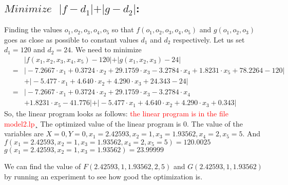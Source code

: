 \documentclass[12pt]{article}
\begin{document}
\subsection{$Minimize \text{ } \vert f-d_1 \vert + \vert g-d_2 \vert$:} Finding the values $o_1,o_2,o_3,o_4,o_5$ so that $f(o_1,o_2,o_3,o_4,o_5)$ and $g(o_1,o_2,o_3)$  goes as close as possible to constant values $d_1$ and $d_2$ respectively. Let us set $d_1 = 120$ and $d_2 = 24$. We need to minimize
\begin{eqnarray*}
& &\vert f(x_1,x_2,x_3,x_4,x_5)-120 \vert + \vert g(x_1,x_2,x_3)-24 \vert \\ 
&=& \vert -7.2667 \cdot x_1 + 0.3724 \cdot x_2 + 29.1759 \cdot x_3 - 3.2784 \cdot x_4 + 1.8231 \cdot x_5 + 78.2264 - 120 \vert \\
& & + \vert -5.477 \cdot x_1 + 4.640 \cdot x_2 + 4.290 \cdot x_3 + 24.343 -24 \vert \\
& = &  \vert -7.2667 \cdot x_1 + 0.3724 \cdot x_2 + 29.1759 \cdot x_3 - 3.2784 \cdot x_4\\
& & + 1.8231 \cdot x_5 - 41.776 \vert + \vert -5.477 \cdot x_1 + 4.640 \cdot x_2 + 4.290 \cdot x_3 + 0.343 \vert
\end{eqnarray*}
So, the linear program looks as follows: \textcolor{red}{the linear program is in the file model2.lp}¸
The optimized value of the linear program is $0$. The value of the variables are $X = 0, Y = 0, x_1 = 2.42593, x_2 = 1, x_3 = 1.93562, x_4 = 2, x_5 = 5$. And \\
$f(x_1 = 2.42593, x_2 = 1, x_3 = 1.93562, x_4 = 2, x_5 = 5) = 120.0025$\\
$g(x_1 = 2.42593, x_2 = 1, x_3 = 1.93562) = 23.99999$

We can find the value of $F(2.42593, 1, 1.93562, 2, 5)$ and $G(2.42593, 1, 1.93562)$ by running an experiment to see how good the optimization is.
\end{document}
